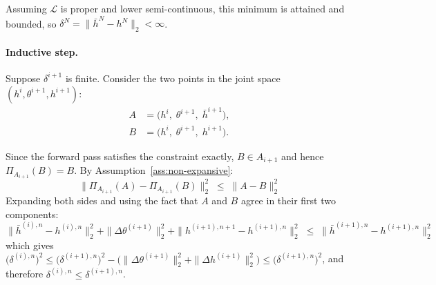 \documentclass{article}
\begin{document}
Assuming $\mathcal{L}$ is proper and lower semi-continuous, this minimum is attained and bounded, so $\delta^{N} = \|\bar{h}^{N} - h^{N}\|_2 < \infty$.

\paragraph{Inductive step.}
Suppose $\delta^{i+1}$ is finite. Consider the two points in the joint space $(h^{i}, \theta^{i+1}, h^{i+1})$:
\begin{align*}
A &= \bigl(h^{i},\; \theta^{i+1},\; \bar{h}^{i+1}\bigr), \\
B &= \bigl(h^{i},\; \theta^{i+1},\; h^{i+1}\bigr).
\end{align*}

Since the forward pass satisfies the constraint exactly, $B \in A_{i+1}$ and hence $\Pi_{A_{i+1}}(B) = B$. By Assumption~\ref{ass:non-expansive}:
\[
\|\Pi_{A_{i+1}}(A) - \Pi_{A_{i+1}}(B)\|_2^2 \;\leq\; \|A - B\|_2^2
\]
Expanding both sides and using the fact that $A$ and $B$ agree in their first two components:
\[
\|\bar{h}^{(i), n} - h^{(i), n}\|_2^2 + \|\Delta \theta^{(i+1)}\|_2^2 + \| h^{(i+1), n+1} - h^{(i+1), n}\|_2^2
\;\leq\;
\|\bar{h}^{(i+1), n} - h^{(i+1), n}\|_2^2
\]
which gives $\bigl(\delta^{(i), n}\bigr)^2 \leq \bigl(\delta^{(i+1), n}\bigr)^2 - \bigl(\|\Delta \theta^{(i+1)}\|_2^2 + \|\Delta h^{(i+1)}\|_2^2\bigr) \leq \bigl(\delta^{(i+1), n}\bigr)^2$, and therefore $\delta^{(i), n} \leq \delta^{(i+1), n}$.
\end{document}
